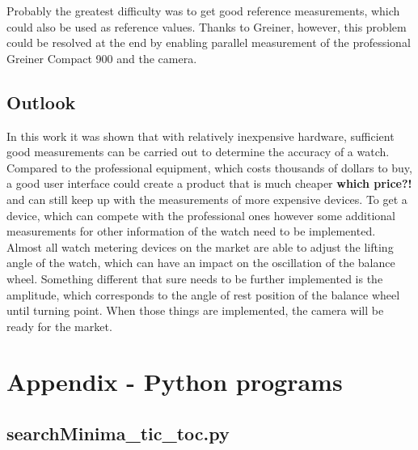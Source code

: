 \documentclass[12pt, a4paper]{report}
\begin{document}
Probably the greatest difficulty was to get good reference measurements, which could also be used as reference values. Thanks to Greiner, however, this problem could be resolved at the end by enabling parallel measurement of the professional Greiner Compact 900 and the camera.

    \section{Outlook}
    In this work it was shown that with relatively inexpensive hardware, sufficient good measurements can be carried out to determine the accuracy of a watch. Compared to the professional equipment, which costs thousands of dollars to buy, a good user interface could create a product that is much cheaper \textbf{which price?!} and can still keep up with the measurements of more expensive devices. 
 To get a device, which can compete with the professional ones however some additional measurements for other information of the watch need to be implemented. Almost all watch metering devices on the market are able to adjust the lifting angle of the watch, which can have an impact on the oscillation of the balance wheel. Something different that sure needs to be further implemented is the amplitude, which corresponds to the angle of rest position of the balance wheel until turning point. When those things are implemented, the camera will be ready for the market. 
    
    \glsaddall
    \printglossaries

\printbibliography
        
    \listoffigures
    \bigskip
      
     \chapter*{Appendix - Python programs}  
     \section*{searchMinima\_tic\_toc.py}  
    
    
\end{document}
